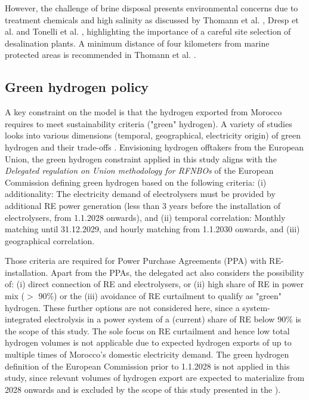 \documentclass[5p,numafflabel]{elsarticle}
\begin{document}
However, the challenge of brine disposal presents environmental concerns due to treatment chemicals and high salinity as discussed by Thomann et al. \cite{Thomann2022}, Dresp et al. \cite{Dresp2019} and Tonelli et al. \cite{Tonelli2023}, highlighting the importance of a careful site selection of desalination plants. A minimum distance of four kilometers from marine protected areas is recommended in Thomann et al. \cite{Thomann2022}.



\subsection*{Green hydrogen policy}
\label{subsec:green_hydrogen_constraint}


A key constraint on the model is that the hydrogen exported from Morocco requires to meet sustainability criteria ("green" hydrogen). A variety of studies looks into various dimensions (temporal, geographical, electricity origin) of green hydrogen and their trade-offs \cite{Brauer2022, Ruhnau2023, Zeyen2024}.
Envisioning hydrogen offtakers from the European Union, the green hydrogen constraint applied in this study aligns with the \emph{Delegated regulation on Union methodology for RFNBOs} of the European Commission \cite{Commission2023} defining green hydrogen based on the following criteria:
(i) additionality: The electricity demand of electrolysers must be provided by additional RE power generation (less than 3 years before the installation of electrolysers, from 1.1.2028 onwards), and
(ii) temporal correlation: Monthly matching until 31.12.2029, and hourly matching from 1.1.2030 onwards, and
(iii) geographical correlation.

Those criteria are required for Power Purchase Agreements (PPA) with RE-installation. Apart from the PPAs, the delegated act also considers the possibility of:
(i) direct connection of RE and electrolysers, or
(ii) high share of RE in power mix ($>$ 90\%) or the
(iii) avoidance of RE curtailment
to qualify as "green" hydrogen. These further options are not considered here, since a system-integrated electrolysis in a power system of a (current) share of RE below 90\% is the scope of this study. The sole focus on RE curtailment and hence low total hydrogen volumes is not applicable due to expected hydrogen exports of up to multiple times of Morocco's domestic electricity demand. The green hydrogen definition of the European Commission prior to 1.1.2028 is not applied in this study, since relevant volumes of hydrogen export are expected to materialize from 2028 onwards and is excluded by the scope of this study presented in the ).
\end{document}
